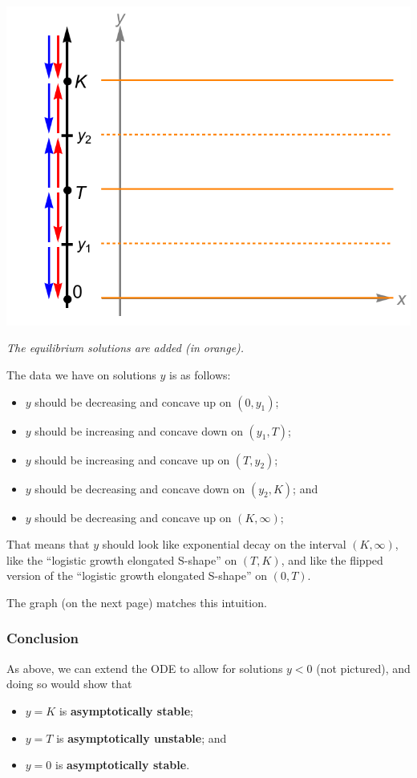 \documentclass[12pt]{article}
\theoremstyle{definition}
\theoremstyle{underl}
\newcommand{\capt}[1]{\begin{adjustwidth}{0.5in}{0.5in}\centering\small\textit{#1}\end{adjustwidth}}
\begin{document}
	\begin{center}
		\includegraphics[align=c,scale=0.875]{Ex2_xy_2}
		\vspace{1.5mm}
		\capt{The equilibrium solutions are added (in orange).}
	\end{center}
	The data we have on solutions $y$ is as follows:
	\begin{itemize}
		\item $y$ should be decreasing and concave up on $(0,y_1)$;
		\item $y$ should be increasing and concave down on $(y_1,T)$; 
		\item $y$ should be increasing and concave up on $(T,y_2)$;
		\item $y$ should be decreasing and concave down on $(y_2,K)$; and
		\item $y$ should be decreasing and concave up on $(K,\infty)$;
	\end{itemize}
	That means that $y$ should look like exponential decay on the interval $(K,\infty)$, like the ``logistic growth elongated S-shape'' on $(T,K)$, and like the flipped version of the ``logistic growth elongated S-shape'' on $(0,T)$. 
	
	The graph (on the next page) matches this intuition.

	\subsubsection*{Conclusion}
	As above, we can extend the ODE to allow for solutions $y<0$ (not pictured), and doing so would show that
	\begin{itemize}
		\item $y=K$ is \textbf{asymptotically stable};
		\item $y=T$ is \textbf{asymptotically unstable}; and
		\item $y=0$ is \textbf{asymptotically stable}.
	\end{itemize}	
\end{document}
